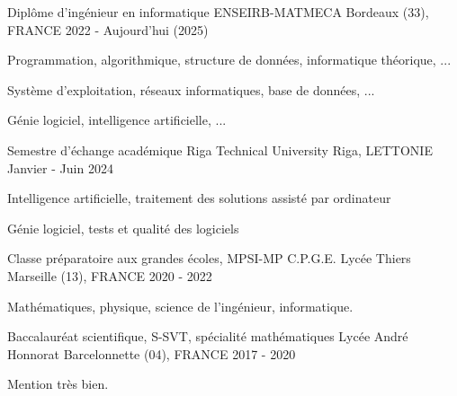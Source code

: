 

\begin{cventries}

  \cventry
    {Diplôme d'ingénieur en informatique} %
    {ENSEIRB-MATMECA} %
    {Bordeaux (33), FRANCE} %
    {2022 - Aujourd'hui (2025)} %
    {
      \begin{cvitems} %
        \item{Programmation, algorithmique, structure de données, informatique théorique, ...}
        \item{Système d'exploitation, réseaux informatiques, base de données, ...}
        \item{Génie logiciel, intelligence artificielle, ...}
      \end{cvitems}
    }

  \cventry
    {Semestre d'échange académique} %
    {Riga Technical University} %
    {Riga, LETTONIE} %
    {Janvier - Juin 2024} %
    {
      \begin{cvitems} %
        \item{Intelligence artificielle, traitement des solutions assisté par ordinateur}
        \item{Génie logiciel, tests et qualité des logiciels}
      \end{cvitems}
    }

  \cventry
    {Classe préparatoire aux grandes écoles, MPSI-MP} %
    {C.P.G.E. Lycée Thiers} %
    {Marseille (13), FRANCE} %
    {2020 - 2022} %
    {
      \begin{cvitems} %
        \item{Mathématiques, physique, science de l'ingénieur, informatique.}
      \end{cvitems}
    }

  \cventry
    {Baccalauréat scientifique, S-SVT, spécialité mathématiques} %
    {Lycée André Honnorat} %
    {Barcelonnette (04), FRANCE} %
    {2017 - 2020} %
    {
      \begin{cvitems} %
        \item{Mention très bien.}
      \end{cvitems}
    }


\end{cventries}
